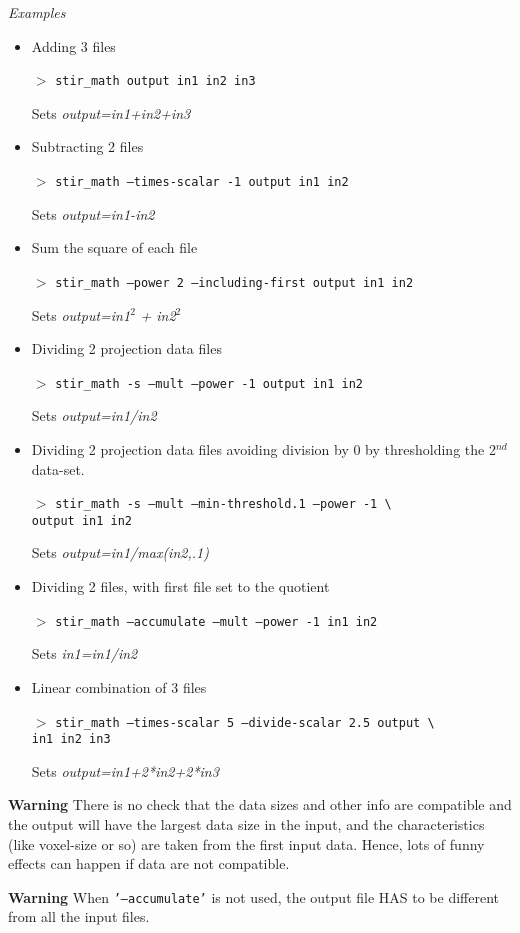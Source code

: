 \documentclass{article}
\newcommand{\cmdline}[1]{\par \noindent $>$ \texttt{#1}\par}
\begin{document}
\textit{Examples}
\begin{itemize}
\item
Adding 3 files
\cmdline{stir\_math output in1 in2 in3}


Sets \textit{output=in1+in2+in3}\\
\item
Subtracting 2 files
\cmdline{stir\_math --times-scalar -1 output in1 in2}


Sets \textit{output=in1-in2}\\
\item
Sum the square of each file
\cmdline{stir\_math --power 2 --including-first output in1 in2}


Sets \textit{output=in1}$^{\mathit{2}}$ \textit{+ in2}$^{\mathit{2}}$\\
\item
Dividing 2 projection data files
\cmdline{stir\_math -s --mult --power -1 output in1 in2}


Sets \textit{output=in1/in2}\\
\item
Dividing 2 projection data files avoiding division by 0 by thresholding 
the 2$^{nd}$ data-set.
\cmdline{stir\_math -s --mult --min-threshold.1 --power -1 {\textbackslash}\\
output in1 in2}


Sets \textit{output=in1/max(in2,.1)}\\
\item
Dividing 2 files, with first file set to the quotient
\cmdline{stir\_math --accumulate --mult --power -1 in1 in2}


Sets \textit{in1=in1/in2}\\
\item
Linear combination of 3 files
\cmdline{stir\_math --times-scalar 5 --divide-scalar 2.5 output {\textbackslash}\\
in1 in2 in3}


Sets \textit{output=in1+2*in2+2*in3}
\end{itemize}

\textbf{Warning} There is no check that the data sizes and other info 
are compatible and the output will have the largest data size 
in the input, and the characteristics (like voxel-size or so) 
are taken from the first input data. Hence, lots of funny effects 
can happen if data are not compatible.


\textbf{Warning} When \texttt{'--accumulate'} is not used, the output file 
HAS to be different from all the input files.
\end{document}

